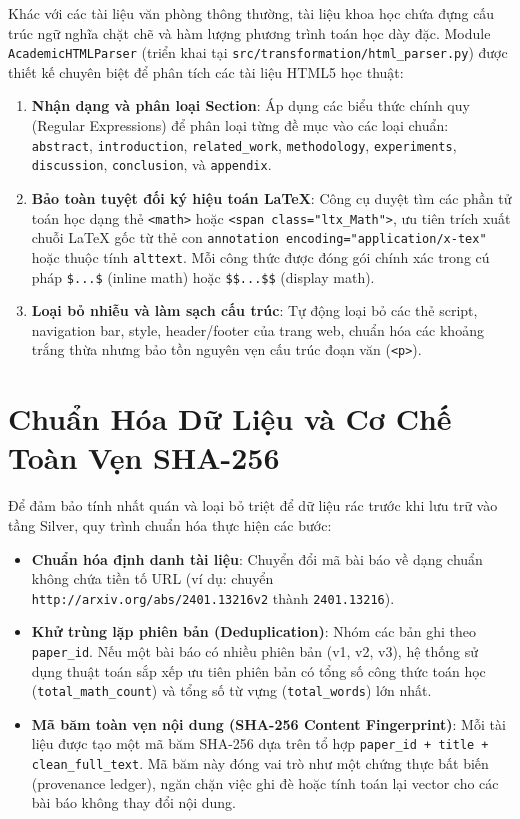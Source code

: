 Khác với các tài liệu văn phòng thông thường, tài liệu khoa học chứa đựng cấu trúc ngữ nghĩa chặt chẽ và hàm lượng phương trình toán học dày đặc. Module \texttt{AcademicHTMLParser} (triển khai tại \texttt{src/transformation/html\_parser.py}) được thiết kế chuyên biệt để phân tích các tài liệu HTML5 học thuật:

\begin{enumerate}[label=\alph*)]
  \item \textbf{Nhận dạng và phân loại Section}: Áp dụng các biểu thức chính quy (Regular Expressions) để phân loại từng đề mục vào các loại chuẩn: \texttt{abstract}, \texttt{introduction}, \texttt{related\_work}, \texttt{methodology}, \texttt{experiments}, \texttt{discussion}, \texttt{conclusion}, và \texttt{appendix}.
  \item \textbf{Bảo toàn tuyệt đối ký hiệu toán LaTeX}: Công cụ duyệt tìm các phần tử toán học dạng thẻ \texttt{<math>} hoặc \texttt{<span class="ltx\_Math">}, ưu tiên trích xuất chuỗi LaTeX gốc từ thẻ con \texttt{annotation encoding="application/x-tex"} hoặc thuộc tính \texttt{alttext}. Mỗi công thức được đóng gói chính xác trong cú pháp \lstinline{$...$} (inline math) hoặc \lstinline{$$...$$} (display math).
  \item \textbf{Loại bỏ nhiễu và làm sạch cấu trúc}: Tự động loại bỏ các thẻ script, navigation bar, style, header/footer của trang web, chuẩn hóa các khoảng trắng thừa nhưng bảo tồn nguyên vẹn cấu trúc đoạn văn (\texttt{<p>}).
\end{enumerate}

\section{Chuẩn Hóa Dữ Liệu và Cơ Chế Toàn Vẹn SHA-256}

Để đảm bảo tính nhất quán và loại bỏ triệt để dữ liệu rác trước khi lưu trữ vào tầng Silver, quy trình chuẩn hóa thực hiện các bước:
\begin{itemize}
  \item \textbf{Chuẩn hóa định danh tài liệu}: Chuyển đổi mã bài báo về dạng chuẩn không chứa tiền tố URL (ví dụ: chuyển \texttt{http://arxiv.org/abs/2401.13216v2} thành \texttt{2401.13216}).
  \item \textbf{Khử trùng lặp phiên bản (Deduplication)}: Nhóm các bản ghi theo \texttt{paper\_id}. Nếu một bài báo có nhiều phiên bản (v1, v2, v3), hệ thống sử dụng thuật toán sắp xếp ưu tiên phiên bản có tổng số công thức toán học (\texttt{total\_math\_count}) và tổng số từ vựng (\texttt{total\_words}) lớn nhất.
  \item \textbf{Mã băm toàn vẹn nội dung (SHA-256 Content Fingerprint)}: Mỗi tài liệu được tạo một mã băm SHA-256 dựa trên tổ hợp \texttt{paper\_id + title + clean\_full\_text}. Mã băm này đóng vai trò như một chứng thực bất biến (provenance ledger), ngăn chặn việc ghi đè hoặc tính toán lại vector cho các bài báo không thay đổi nội dung.
\end{itemize}


